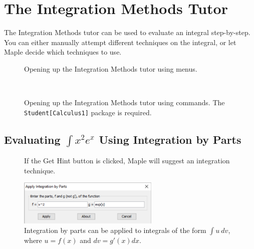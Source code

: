 \section{The Integration Methods Tutor}


The Integration Methods tutor can be used to evaluate an integral step-by-step. You can either manually attempt different techniques on the integral, or let Maple decide which techniques to use. 

\begin{figure}[h]
\caption{Opening up the Integration Methods tutor using menus.}
\centering
{}
\end{figure}

\begin{figure}[h]
\caption{Opening up the Integration Methods tutor using commands. The \texttt{Student[Calculus1]} package is required.}
\centering
{}
\\
\end{figure}

\clearpage

\subsection{Evaluating $\displaystyle\int x^2e^x$ Using Integration by Parts}


\begin{figure}[h]
\caption{If the Get Hint button is clicked, Maple will suggest an integration technique.}
\centering
{}
\end{figure}


\begin{figure}[h]
\caption{Integration by parts  can be applied to integrals of the form $\int u~dv$, where $u=f(x)$ and $dv = g'(x) dx$.}
\centering
\includegraphics[width=0.6\textwidth]{tutorials/figures/IntTutorQ1-2-eps-converted-to.pdf}
\end{figure}

